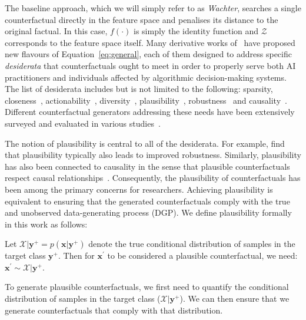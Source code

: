 The baseline approach, which we will simply refer to as \textit{Wachter}, searches a single counterfactual directly in the feature space and penalises its distance to the original factual. In this case, $f(\cdot)$ is simply the identity function and $\mathcal{Z}$ corresponds to the feature space itself. Many derivative works of~\citet{wachter2017counterfactual} have proposed new flavours of Equation~\ref{eq:general}, each of them designed to address specific \textit{desiderata} that counterfactuals ought to meet in order to properly serve both AI practitioners and individuals affected by algorithmic decision-making systems. The list of desiderata includes but is not limited to the following: sparsity, closeness~\citep{wachter2017counterfactual}, actionability~\citep{ustun2019actionable}, diversity~\citep{mothilal2020explaining}, plausibility~\citep{joshi2019realistic,poyiadzi2020face,schut2021generating}, robustness~\citep{upadhyay2021robust,pawelczyk2022probabilistically,altmeyer2023endogenous} and causality~\citep{karimi2021algorithmic}. Different counterfactual generators addressing these needs have been extensively surveyed and evaluated in various studies~\citep{verma2020counterfactual,karimi2020survey,pawelczyk2021carla,artelt2021evaluating,guidotti2022counterfactual}. 

The notion of plausibility is central to all of the desiderata. For example, \citet{artelt2021evaluating} find that plausibility typically also leads to improved robustness. Similarly, plausibility has also been connected to causality in the sense that plausible counterfactuals respect causal relationships~\citep{mahajan2019preserving}. Consequently, the plausibility of counterfactuals has been among the primary concerns for researchers. Achieving plausibility is equivalent to ensuring that the generated counterfactuals comply with the true and unobserved data-generating process (DGP). We define plausibility formally in this work as follows:

\begin{definition}
  \label{def:plausible}
  Let $\mathcal{X}|\mathbf{y}^+= p(\mathbf{x}|\mathbf{y}^+)$ denote the true conditional distribution of samples in the target class $\mathbf{y}^+$. Then for $\mathbf{x}^{\prime}$ to be considered a plausible counterfactual, we need: $\mathbf{x}^{\prime} \sim \mathcal{X}|\mathbf{y}^+$.
\end{definition}

To generate plausible counterfactuals, we first need to quantify the conditional distribution of samples in the target class ($\mathcal{X}|\mathbf{y}^+$). We can then ensure that we generate counterfactuals that comply with that distribution.

